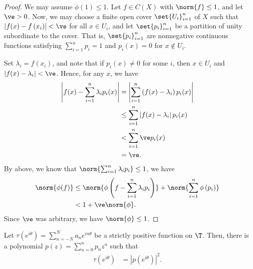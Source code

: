 \documentclass[10pt]{mypackage}
\begin{document}
\begin{proof}
  We may assume $\phi(1)\leq 1$. Let $f\in C(X)$ with $\norm{f}\leq 1$, and let $\ve > 0$. Now, we may choose a finite open cover $\set{U_i}_{i=1}^{n}$ of $X$ such that $\left\vert f(x) - f\left( x_i \right) \right\vert < \ve$ for all $x\in U_i$, and let $\set{p_i}_{i = 1}^{n}$ be a partition of unity subordinate to the cover. That is, $\set{p_i}_{i=1}^{n}$ are nonnegative continuous functions satisfying $\sum_{i=1}^{n}p_i = 1$ and $p_i(x) = 0$ for $x\notin U_i$.\newline

  Set $\lambda_i = f\left( x_i \right)$, and note that if $p_i(x)\neq 0$ for some $i$, then $x\in U_i$ and $\left\vert f(x) - \lambda_i \right\vert < \ve$. Hence, for any $x$, we have
  \begin{align*}
    \left\vert f(x) - \sum_{i=1}^{n}\lambda_ip_i(x) \right\vert &= \left\vert \sum_{i=1}^{n}\left( f(x) - \lambda_i \right)p_i(x) \right\vert\\
                                                                &\leq \sum_{i=1}^{n}\left\vert f(x) - \lambda_i \right\vert p_i(x)\\
                                                                &< \sum_{i=1}^{n}\ve p_i(x)\\
                                                                &= \ve.
  \end{align*}
  By above, we know that $\norm{\sum_{i=1}^{n}\lambda_ip_i} \leq 1$, we have
  \begin{align*}
    \norm{\phi(f)} &\leq \norm{\phi\left( f - \sum_{i=1}^{n}\lambda_ip_i \right)} + \norm{\sum_{i=1}^{n}\phi\left( p_i \right)}\\
                   &< 1 + \ve\norm{\phi}.
  \end{align*}
  Since $\ve$ was arbitrary, we have $\norm{\phi} \leq 1$.
\end{proof}
\begin{lemma}
  Let $\tau\left( e^{i\theta} \right) = \sum_{n=-N}^{N} a_ne^{in\theta}$ be a strictly positive function on $\T$. Then, there is a polynomial $p(z) = \sum_{n=0}^{n}p_nz^n$ such that
  \begin{align*}
    \tau\left( e^{i\theta} \right) &= \left\vert p\left( e^{i\theta} \right) \right\vert^{2}.
  \end{align*}
\end{lemma}
\end{document}
